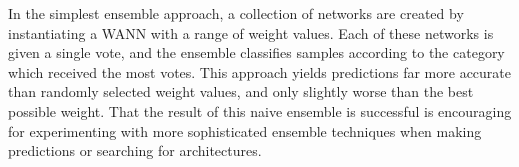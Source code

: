 %

In the simplest ensemble approach, a collection of networks are created by instantiating a WANN with a range of weight values. 
%
Each of these networks is given a single vote, and the ensemble classifies samples according to the category which received the most votes.
%
This approach yields predictions far more accurate than randomly selected weight values, and only slightly worse than the best possible weight.
%
That the result of this naive ensemble is successful is encouraging for experimenting with more sophisticated ensemble techniques when making predictions or searching for architectures.



